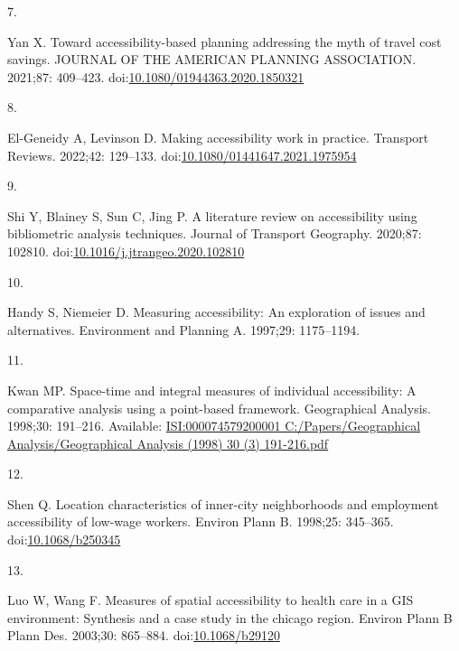 \documentclass[10pt,letterpaper]{article}
\newlength{\cslhangindent}
\newlength{\csllabelwidth}
\newlength{\cslentryspacingunit} %
\newenvironment{CSLReferences}[2] %
 {%
  \setlength{\parindent}{0pt}
  \ifodd #1
  \let\oldpar\par
  \def\par{\hangindent=\cslhangindent\oldpar}
  \fi
  \setlength{\parskip}{#2\cslentryspacingunit}
 }%
 {}
\newcommand{\CSLLeftMargin}[1]{\parbox[t]{\csllabelwidth}{#1}}
\newcommand{\CSLRightInline}[1]{\parbox[t]{\linewidth - \csllabelwidth}{#1}\break}
\begin{document}
\begin{CSLReferences}{0}{0}
\leavevmode{}%
\CSLLeftMargin{7. }%
\CSLRightInline{Yan X. Toward accessibility-based planning addressing
the myth of travel cost savings. {JOURNAL} {OF} {THE} {AMERICAN}
{PLANNING} {ASSOCIATION}. 2021;87: 409--423.
doi:\href{https://doi.org/10.1080/01944363.2020.1850321}{10.1080/01944363.2020.1850321}}

\leavevmode{}%
\CSLLeftMargin{8. }%
\CSLRightInline{El-Geneidy A, Levinson D. Making accessibility work in
practice. Transport Reviews. 2022;42: 129--133.
doi:\href{https://doi.org/10.1080/01441647.2021.1975954}{10.1080/01441647.2021.1975954}}

\leavevmode{}%
\CSLLeftMargin{9. }%
\CSLRightInline{Shi Y, Blainey S, Sun C, Jing P. A literature review on
accessibility using bibliometric analysis techniques. Journal of
Transport Geography. 2020;87: 102810.
doi:\href{https://doi.org/10.1016/j.jtrangeo.2020.102810}{10.1016/j.jtrangeo.2020.102810}}

\leavevmode{}%
\CSLLeftMargin{10. }%
\CSLRightInline{Handy S, Niemeier D. Measuring accessibility: An
exploration of issues and alternatives. Environment and Planning A.
1997;29: 1175--1194. }

\leavevmode{}%
\CSLLeftMargin{11. }%
\CSLRightInline{Kwan MP. Space-time and integral measures of individual
accessibility: A comparative analysis using a point-based framework.
Geographical Analysis. 1998;30: 191--216. Available:
\href{https://ISI:000074579200001\%0AC:/Papers/Geographical\%20Analysis/Geographical\%20Analysis\%20(1998)\%2030\%20(3)\%20191-216.pdf}{ISI:000074579200001
C:/Papers/Geographical Analysis/Geographical Analysis (1998) 30 (3)
191-216.pdf}}

\leavevmode{}%
\CSLLeftMargin{12. }%
\CSLRightInline{Shen Q. Location characteristics of inner-city
neighborhoods and employment accessibility of low-wage workers. Environ
Plann B. 1998;25: 345--365.
doi:\href{https://doi.org/10.1068/b250345}{10.1068/b250345}}

\leavevmode{}%
\CSLLeftMargin{13. }%
\CSLRightInline{Luo W, Wang F. Measures of spatial accessibility to
health care in a {GIS} environment: Synthesis and a case study in the
chicago region. Environ Plann B Plann Des. 2003;30: 865--884.
doi:\href{https://doi.org/10.1068/b29120}{10.1068/b29120}}


\end{CSLReferences}
\end{document}

